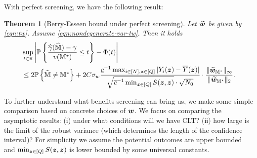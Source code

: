 \documentclass[12pt]{article}
\newtheorem{theorem}{Theorem}
\begin{document}
With perfect  screening, we have the following result:
\begin{theorem}[Berry-Esseen bound under perfect  screening]\label{thm:be-perfect-ms}
Let $ \widetilde{{\boldsymbol{w}}}$ be given by \eqref{eqn:tw}. Assume \eqref{eqn:nondegenerate-var-tw}. 
Then it holds
\begin{align}\label{eqn:be-perfect-ms}
    &\sup_{t\in{\mathbb{R}}}\left|{{\mathbb{P}}\left\{\frac{{\widehat{\gamma}}(\widehat{{\mathbb{M}}})-\gamma}{v({\mathbb{M}}^\star)} \le t\right\}} - \Phi(t)\right| \notag\\
    &\le 2{{\mathbb{P}}\left\{\widehat{{\mathbb{M}}}\neq {\mathbb{M}}^\star\right\}} +  2C\sigma_w   \frac{\underline{c}^{-1} \max_{i\in[N],{\boldsymbol{z}}\in[Q]}|Y_i({\boldsymbol{z}})-\overline{Y}({\boldsymbol{z}})|}{\sqrt{\overline{c}^{-1} \min_{{\boldsymbol{z}}\in[Q]} S({\boldsymbol{z}},{\boldsymbol{z}})}\cdot \sqrt{N_0}}\cdot  \frac{\|\widetilde{{\boldsymbol{w}}}_{{\mathbb{M}}^\star}\|_\infty}{\|\widetilde{{\boldsymbol{w}}}_{{\mathbb{M}}^\star}\|_2} .
\end{align}
\end{theorem}


To further understand what benefits  screening can bring us, we make some simple comparison based on  concrete choices of ${\boldsymbol{w}}$. We focus on comparing the asymptotic results: (i) under what conditions will we have CLT? (ii) how large is the limit of the robust variance (which determines the length of the confidence interval)? For simplicity we assume the potential outcomes are upper bounded and $\min_{{\boldsymbol{z}}\in[Q]} S({\boldsymbol{z}},{\boldsymbol{z}})$ is lower bounded by some universal constants. 
\end{document}
